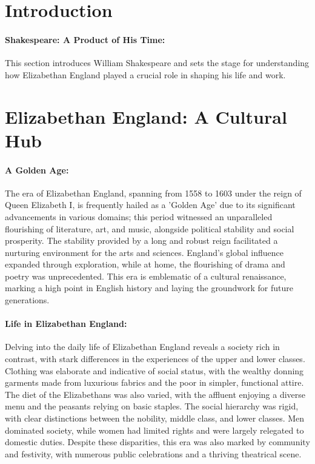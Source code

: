 \documentclass[a4paper,12pt]{book}
\begin{document}
\section*{Introduction}

\paragraph{Shakespeare: A Product of His Time:}
This section introduces William Shakespeare and sets the stage for understanding how Elizabethan England played a crucial role in shaping his life and work.

\section*{Elizabethan England: A Cultural Hub}

\paragraph{A Golden Age:}
The era of Elizabethan England, spanning from 1558 to 1603 under the reign of Queen Elizabeth I, is frequently hailed as a 'Golden Age' due to its significant advancements in various domains; this period witnessed an unparalleled flourishing of literature, art, and music, alongside political stability and social prosperity. The stability provided by a long and robust reign facilitated a nurturing environment for the arts and sciences. England’s global influence expanded through exploration, while at home, the flourishing of drama and poetry was unprecedented. This era is emblematic of a cultural renaissance, marking a high point in English history and laying the groundwork for future generations.

\paragraph{Life in Elizabethan England:}
Delving into the daily life of Elizabethan England reveals a society rich in contrast, with stark differences in the experiences of the upper and lower classes. Clothing was elaborate and indicative of social status, with the wealthy donning garments made from luxurious fabrics and the poor in simpler, functional attire. The diet of the Elizabethans was also varied, with the affluent enjoying a diverse menu and the peasants relying on basic staples. The social hierarchy was rigid, with clear distinctions between the nobility, middle class, and lower classes. Men dominated society, while women had limited rights and were largely relegated to domestic duties. Despite these disparities, this era was also marked by community and festivity, with numerous public celebrations and a thriving theatrical scene.
\end{document}
